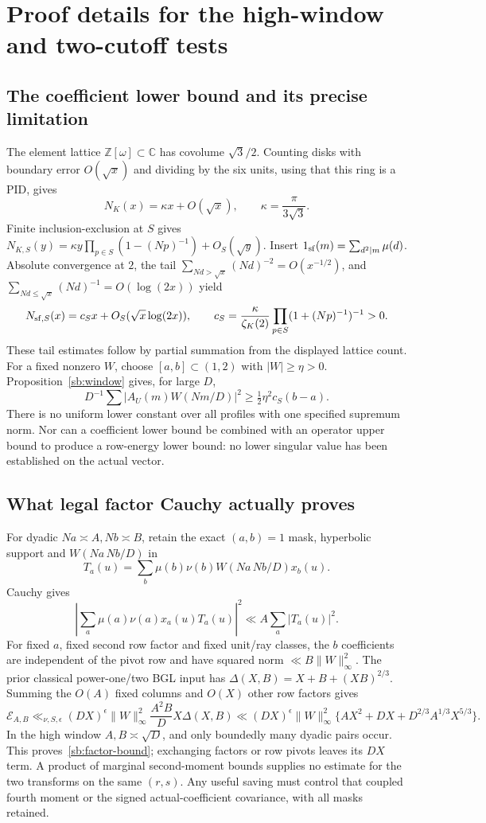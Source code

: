 \documentclass[11pt,oneside,openany]{book}
\theoremstyle{definition}\newtheorem{definition}[theorem]{Definition}
\theoremstyle{remark}\newtheorem{remark}[theorem]{Remark}
\begin{document}
\section{Proof details for the high-window and two-cutoff tests}\label{sb:details}
\subsection{The coefficient lower bound and its precise limitation}
The element lattice $\mathbb Z[\omega]\subset\mathbb C$ has covolume
$\sqrt3/2$. Counting disks with boundary error $O(\sqrt x)$ and dividing
by the six units, using that this ring is a PID, gives
\[
 N_K(x)=\kappa x+O(\sqrt x),\qquad \kappa=\frac{\pi}{3\sqrt3}.
\]
Finite inclusion-exclusion at $S$ gives
$N_{K,S}(y)=\kappa y\prod_{p\in S}(1-(Np)^{-1})+O_S(\sqrt y)$.
Insert $1_{\rm sf}(m)=\sum_{d^2\mid m}\mu(d)$. Absolute convergence at
$2$, the tail $\sum_{Nd>\sqrt x}(Nd)^{-2}=O(x^{-1/2})$, and
$\sum_{Nd\le\sqrt x}(Nd)^{-1}=O(\log(2x))$ yield
\[
 N_{{\rm sf},S}(x)=c_Sx+O_S(\sqrt x\log(2x)),\qquad
 c_S=\frac{\kappa}{\zeta_K(2)}\prod_{p\in S}(1+(Np)^{-1})^{-1}>0.
\]
These tail estimates follow by partial summation from the displayed lattice
count. For a fixed nonzero $W$, choose $[a,b]\subset(1,2)$ with
$|W|\ge\eta>0$. Proposition~\ref{sb:window} gives, for large $D$,
\[
 D^{-1}\sum|A_U(m)W(Nm/D)|^2\ge\tfrac12\eta^2c_S(b-a).
\]
There is no uniform lower constant over all profiles with one specified
supremum norm. Nor can a coefficient lower bound be combined with an
operator upper bound to produce a row-energy lower bound: no lower singular
value has been established on the actual vector.

\subsection{What legal factor Cauchy actually proves}
For dyadic $Na\asymp A,Nb\asymp B$, retain the exact $(a,b)=1$ mask,
hyperbolic support and $W(Na\,Nb/D)$ in
\[
 T_a(u)=\sum_b\mu(b)\nu(b)W(Na\,Nb/D)x_b(u).
\]
Cauchy gives
\[
 |\sum_a\mu(a)\nu(a)x_a(u)T_a(u)|^2\ll A\sum_a|T_a(u)|^2.
\]
For fixed $a$, fixed second row factor and fixed unit/ray classes, the
$b$ coefficients are independent of the pivot row and have squared norm
$\ll B\|W\|_\infty^2$. The prior classical power-one/two BGL input has
$\Delta(X,B)=X+B+(XB)^{2/3}$. Summing the $O(A)$ fixed columns and
$O(X)$ other row factors gives
\[
 \mathcal E_{A,B}\ll_{\nu,S,\epsilon}(DX)^\epsilon\|W\|_\infty^2
 \frac{A^2B}{D}X\Delta(X,B)
 \ll (DX)^\epsilon\|W\|_\infty^2
 \{AX^2+DX+D^{2/3}A^{1/3}X^{5/3}\}.
\]
In the high window $A,B\asymp\sqrt D$, and only boundedly many dyadic
pairs occur. This proves~\eqref{sb:factor-bound}; exchanging factors
or row pivots leaves its $DX$ term. A product of marginal second-moment
bounds supplies no estimate for the two transforms on the same $(r,s)$.
Any useful saving must control that coupled fourth moment or the signed
actual-coefficient covariance, with all masks retained.
\end{document}
